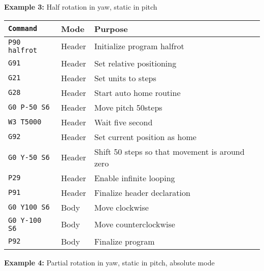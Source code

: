 \vspace{0.3cm}
\noindent
\textbf{Example 3:} Half rotation in yaw, static in pitch


\begin{tabular}{lll}
  \hline
  \texttt{Command}     & Mode   & Purpose                                        \\
  \hline
  \texttt{P90 halfrot} & Header & Initialize program halfrot                     \\
  \texttt{G91}         & Header & Set relative positioning                       \\
  \texttt{G21}         & Header & Set units to steps                             \\
  \texttt{G28}         & Header & Start auto home routine                        \\
  \texttt{G0 P-50 S6}  & Header & Move pitch 50steps                             \\
  \texttt{W3 T5000}    & Header & Wait five second                               \\
  \texttt{G92}         & Header & Set current position as home                   \\
  \texttt{G0 Y-50 S6}  & Header & Shift 50 steps so that movement is around zero \\
  \texttt{P29}         & Header & Enable infinite looping                        \\
  \texttt{P91}         & Header & Finalize header declaration                    \\
  \texttt{G0 Y100 S6}  & Body & Move clockwise                                 \\
  \texttt{G0 Y-100 S6} & Body & Move counterclockwise                          \\
  \texttt{P92}         & Body   & Finalize program                               \\
  \hline
\end{tabular}

\vspace{0.3cm}
\noindent
\textbf{Example 4:} Partial rotation in yaw, static in pitch, absolute mode


